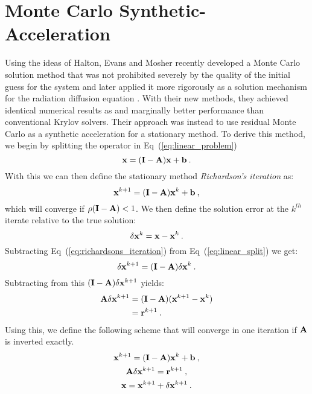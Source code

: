\section{Monte Carlo Synthetic-Acceleration}
\label{sec:mcsa}
Using the ideas of Halton, Evans and Mosher recently developed a Monte
Carlo solution method that was not prohibited severely by the quality
of the initial guess for the system \citep{evans_monte_2009} and later
applied it more rigorously as a solution mechanism for the radiation
diffusion equation \citep{evans_monte_2012}. With their new methods,
they achieved identical numerical results as and marginally better
performance than conventional Krylov solvers. Their approach was
instead to use residual Monte Carlo as a synthetic acceleration for a
stationary method. To derive this method, we begin by splitting the
operator in Eq~(\ref{eq:linear_problem})
\begin{equation}
  \mathbf{x} = (\mathbf{I} - \mathbf{A})\mathbf{x} + \mathbf{b}\:.
  \label{eq:linear_split}
\end{equation}
With this we can then define the stationary method
\textit{Richardson's iteration} as:
\begin{equation}
  \mathbf{x}^{k+1} = (\mathbf{I} - \mathbf{A})\mathbf{x}^k + \mathbf{b}\:,
  \label{eq:richardsons_iteration}
\end{equation}
which will converge if $\rho(\mathbf{I} - \mathbf{A}) < 1$. We then define the
solution error at the $k^{th}$ iterate relative to the true solution:
\begin{equation}
  \delta \mathbf{x}^k = \mathbf{x} - \mathbf{x}^k\:.
  \label{eq:mcsa_error}
\end{equation}
Subtracting Eq~(\ref{eq:richardsons_iteration}) from
Eq~(\ref{eq:linear_split}) we get:
\begin{equation}
  \delta \mathbf{x}^{k+1} = (\mathbf{I} - \mathbf{A})\delta \mathbf{x}^k\:.
  \label{eq:mcsa_setup_1}
\end{equation}
Subtracting from this $(\mathbf{I} - \mathbf{A})\delta \mathbf{x}^{k+1}$ yields:
\begin{equation}
  \begin{split}
    \mathbf{A}\delta \mathbf{x}^{k+1} &= (\mathbf{I} -
    \mathbf{A})(\mathbf{x}^{k+1}-\mathbf{x}^{k}) \\ &= \mathbf{r}^{k+1}\:.
    \label{eq:mcsa_setup_2}
  \end{split}
\end{equation}
Using this, we define the following scheme that will converge in one
iteration if $\mathbf{A}$ is inverted exactly.
\begin{subequations}
  \begin{gather}
    \mathbf{x}^{k+1} = (\mathbf{I} - \mathbf{A})\mathbf{x}^k + \mathbf{b}\:,\\
    \mathbf{A} \delta \mathbf{x}^{k+1} = \mathbf{r}^{k+1}\:,\\
    \mathbf{x} = \mathbf{x}^{k+1} + \delta \mathbf{x}^{k+1}\:.
  \end{gather}
  \label{eq:mcsa_setup_3}
\end{subequations}
